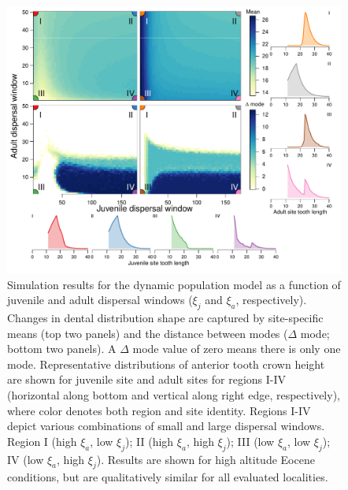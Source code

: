 \documentclass[]{rsos}%
\begin{document}
\begin{figure}
  \centering
  \includegraphics[width=1\linewidth]{fig_means_peaks_highlatitude_rev.pdf}  
\caption{Simulation results for the dynamic population model as a function of juvenile and adult dispersal windows ($\xi_j$ and $\xi_a$, respectively). 
Changes in dental distribution shape are captured by site-specific means (top two panels) and the distance between modes ($\Delta$ mode; bottom two panels).
A $\Delta$ mode value of zero means there is only one mode.
Representative distributions of anterior tooth crown height are shown for juvenile site and adult sites for regions I-IV  (horizontal along bottom and vertical along right edge, respectively), where color denotes both region and site identity.
Regions I-IV depict various combinations of small and large dispersal windows. Region I (high $\xi_a$, low $\xi_j$); II (high $\xi_a$, high $\xi_j$); III (low $\xi_a$, low $\xi_j$); IV (low $\xi_a$, high $\xi_j$).
Results are shown for high altitude Eocene conditions, but are qualitatively similar for all evaluated localities.}
\label{fig:sim}
\end{figure}
\end{document}
